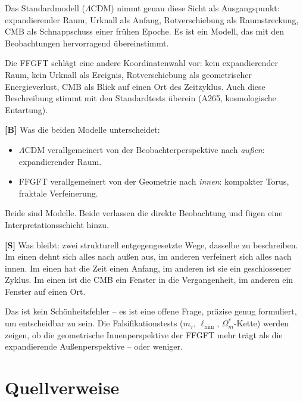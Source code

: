 Das Standardmodell ($\Lambda$CDM) nimmt genau diese Sicht als
Ausgangspunkt: expandierender Raum, Urknall als Anfang,
Rotverschiebung als Raumstreckung, CMB als Schnappschuss einer
frühen Epoche. Es ist ein Modell, das mit den Beobachtungen
hervorragend übereinstimmt.

Die FFGFT schlägt eine andere Koordinatenwahl vor: kein
expandierender Raum, kein Urknall als Ereignis, Rotverschiebung
als geometrischer Energieverlust, CMB als Blick auf einen Ort des
Zeitzyklus. Auch diese Beschreibung stimmt mit den Standardtests
überein (A265, kosmologische Entartung).

\textbf{[B]} Was die beiden Modelle unterscheidet:

\begin{itemize}[leftmargin=1.4em,itemsep=0.2em]
	\item $\Lambda$CDM verallgemeinert von der Beobachterperspektive
	nach \emph{außen}: expandierender Raum.
	\item FFGFT verallgemeinert von der Geometrie nach \emph{innen}:
	kompakter Torus, fraktale Verfeinerung.
\end{itemize}

Beide sind Modelle. Beide verlassen die direkte Beobachtung und
fügen eine Interpretationsschicht hinzu.

\textbf{[S]} Was bleibt: zwei strukturell entgegengesetzte Wege,
dasselbe zu beschreiben. Im einen dehnt sich alles nach außen aus,
im anderen verfeinert sich alles nach innen. Im einen hat die Zeit
einen Anfang, im anderen ist sie ein geschlossener Zyklus. Im einen
ist die CMB ein Fenster in die Vergangenheit, im anderen ein Fenster
auf einen Ort.

Das ist kein Schönheitsfehler – es ist eine offene Frage, präzise
genug formuliert, um entscheidbar zu sein. Die Falsifikationstests
($m_\tau$, $\ell_\text{min}$, $\Omega_m^*$-Kette) werden zeigen,
ob die geometrische Innenperspektive der FFGFT mehr trägt als die
expandierende Außenperspektive – oder weniger.

\section{Quellverweise}

